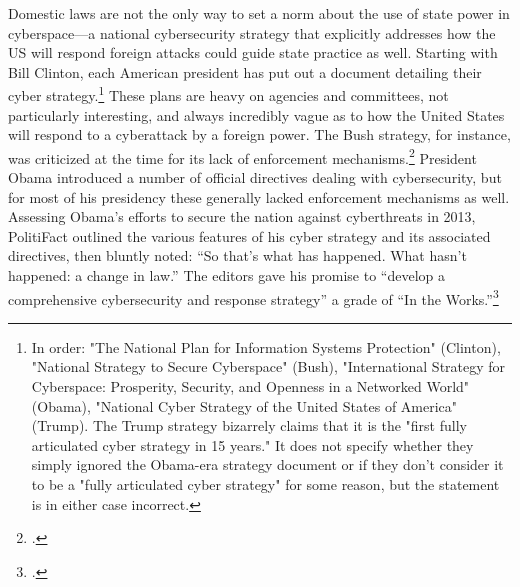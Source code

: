 \documentclass{memoir}
\begin{document}
\begin{refsegment}
Domestic laws are not the only way to set a norm about the use of state power in cyberspace---a national cybersecurity strategy that explicitly addresses how the US will respond foreign attacks could guide state practice as well. Starting with Bill Clinton, each American president has put out a document detailing their cyber strategy.\footnote{In order: "The National Plan for Information Systems Protection" (Clinton), "National Strategy to Secure Cyberspace" (Bush), "International Strategy for Cyberspace: Prosperity, Security, and Openness in a Networked World" (Obama), "National Cyber Strategy of the United States of America" (Trump). The Trump strategy bizarrely claims that it is the "first fully articulated cyber strategy in 15 years." It does not specify whether they simply ignored the Obama-era strategy document or if they don't consider it to be a "fully articulated cyber strategy" for some reason, but the statement is in either case incorrect.} These plans are heavy on agencies and committees, not particularly interesting, and always incredibly vague as to how the United States will respond to a cyberattack by a foreign power. The Bush strategy, for instance, was criticized at the time for its lack of enforcement mechanisms.\footcite{lemos_bush_2003} President Obama introduced a number of official directives dealing with cybersecurity, but for most of his presidency these generally lacked enforcement mechanisms as well. Assessing Obama's efforts to secure the nation against cyberthreats in 2013, PolitiFact outlined the various features of his cyber strategy and its associated directives, then bluntly noted: ``So that's what has happened. What hasn't happened: a change in law.'' The editors gave his promise to ``develop a comprehensive cybersecurity and response strategy'' a grade of ``In the Works.''\footcite{moorhead_work_2013}



\end{refsegment}
\end{document}
